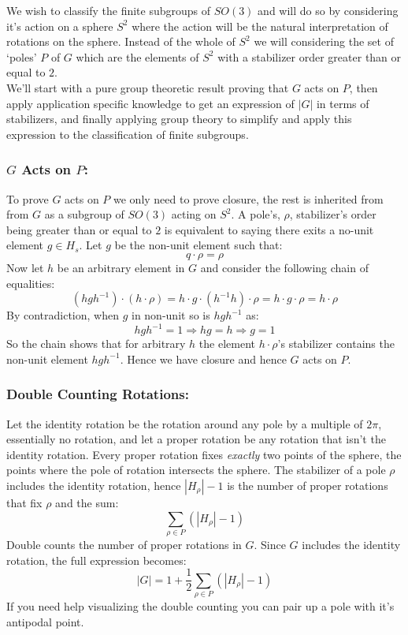 We wish to classify the finite subgroups of $SO(3)$ and will do so by considering it's action on a sphere $S^2$ where the action will be the natural interpretation of rotations on the sphere.
Instead of the whole of $S^2$ we will considering the set of `poles' $P$ of $G$ which are the elements of $S^2$ with a stabilizer order greater than or equal to $2$.
\\

We'll start with a pure group theoretic result proving that $G$ acts on $P$,
then apply application specific knowledge to get an expression of $|G|$ in terms of stabilizers,
and finally applying group theory to simplify and apply this expression to the classification of finite subgroups.

\subsubsection{$G$ Acts on $P$:}
To prove $G$ acts on $P$ we only need to prove closure, 
the rest is inherited from from $G$ as a subgroup of $SO(3)$ acting on $S^2$.
A pole's, $\rho$, stabilizer's order being greater than or equal to $2$ is equivalent to saying there exits a no-unit element $g\in H_s$.
Let $g$ be the non-unit element such that:
\[q\cdot \rho = \rho\]
Now let $h$ be an arbitrary element in $G$ and consider the following chain of equalities:
\[(hgh^{-1})\cdot (h\cdot \rho) = h\cdot g\cdot (h^{-1}h)\cdot \rho = h\cdot g\cdot \rho = h\cdot \rho \]
By contradiction,
when $g$ in non-unit so is $hgh^{-1}$ as:
\[hgh^{-1}=1\Rightarrow hg=h \Rightarrow g=1\]
So the chain shows that for arbitrary $h$ the element $h\cdot\rho$'s stabilizer contains the non-unit element $hgh^{-1}$.
Hence we have closure and hence $G$ acts on $P$.

\subsubsection{Double Counting Rotations:}
Let the identity rotation be the rotation around any pole by a multiple of $2\pi$,
essentially no rotation,
and let a proper rotation be any rotation that isn't the identity rotation.
Every proper rotation fixes {\em exactly} two points of the sphere,
the points where the pole of rotation intersects the sphere.
The stabilizer of a pole $\rho$ includes the identity rotation,
hence $|H_\rho|-1$ is the number of proper rotations that fix $\rho$ and the sum:
\[\sum_{\rho\in P}(|H_\rho|-1)\]
Double counts the number of proper rotations in $G$.
Since $G$ includes the identity rotation,
the full expression becomes:
\[|G| = 1+\frac{1}{2}\sum_{\rho\in P}(|H_\rho|-1)\]
If you need help visualizing the double counting you can pair up a pole with it's antipodal point.
\\

